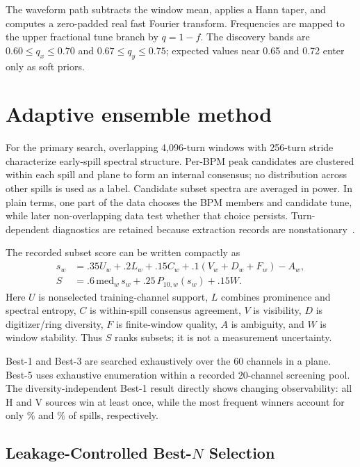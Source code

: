 \documentclass[]{jacow}
\newcommand{\bestn}{Best-$N$}
\begin{document}
The waveform path subtracts the window mean, applies a Hann taper, and computes a zero-padded real fast Fourier transform. Frequencies are mapped to the upper fractional tune branch by $q=1-f$. The discovery bands are $0.60\leq q_x\leq0.70$ and $0.67\leq q_y\leq0.75$; expected values near 0.65 and 0.72 enter only as soft priors.

\section{Adaptive ensemble method}

For the primary search, overlapping 4,096-turn windows with 256-turn stride characterize early-spill spectral structure. Per-BPM peak candidates are clustered within each spill and plane to form an internal consensus; no distribution across other spills is used as a label. Candidate subset spectra are averaged in power. In plain terms, one part of the data chooses the BPM members and candidate tune, while later non-overlapping data test whether that choice persists. Turn-dependent diagnostics are retained because extraction records are nonstationary~\cite{russo:prab2024}.

The recorded subset score can be written compactly as
\begin{align}
s_w &= .35U_w+.2L_w+.15C_w+.1(V_w+D_w+F_w)-A_w,\nonumber\\
S &= .6\,\mathrm{med}_w\,s_w+.25\,P_{10,w}(s_w)+.15W.\nonumber
\end{align}
Here $U$ is nonselected training-channel support, $L$ combines prominence and spectral entropy, $C$ is within-spill consensus agreement, $V$ is visibility, $D$ is digitizer/ring diversity, $F$ is finite-window quality, $A$ is ambiguity, and $W$ is window stability. Thus $S$ ranks subsets; it is not a measurement uncertainty.

Best-1 and Best-3 are searched exhaustively over the 60 channels in a plane. Best-5 uses exhaustive enumeration within a recorded 20-channel screening pool. The diversity-independent Best-1 result directly shows changing observability: all \BestOneUniqueH{} H and \BestOneUniqueV{} V sources win at least once, while the most frequent winners account for only \BestOneMaxFrequencyH{}\% and \BestOneMaxFrequencyV{}\% of spills, respectively.

\subsection{Leakage-Controlled \bestn{} Selection}
\end{document}
